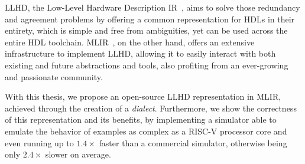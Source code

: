 LLHD, the Low-Level Hardware Description IR~\cite{Schuiki2020}, aims to solve those redundancy and agreement problems by offering a common representation for HDLs in their entirety, which is simple and free from ambiguities, yet can be used across the entire HDL toolchain. MLIR~\cite{Lattner2020}, on the other hand, offers an extensive infrastructure to implement LLHD, allowing it to easily interact with both existing and future abstractions and tools, also profiting from an ever-growing and passionate community.

With this thesis, we propose an open-source LLHD representation in MLIR, achieved through the creation of a \textit{dialect}. Furthermore, we show the correctness of this representation and its benefits, by implementing a simulator able to emulate the behavior of examples as complex as a RISC-V processor core and even running up to $1.4\times$ faster than a commercial simulator, otherwise being only $2.4\times$ slower on average.
